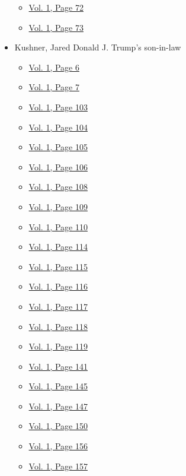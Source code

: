 \begin{itemize}
  \begin{itemize}
  \tightlist
  \item
    \protect\hyperlink{g-page-80}{Vol. 1, Page 72}
  \item
    \protect\hyperlink{g-page-81}{Vol. 1, Page 73}
  \end{itemize}
\item
  Kushner, Jared Donald J. Trump's son-in-law

  \begin{itemize}
  \tightlist
  \item
    \protect\hyperlink{g-page-14}{Vol. 1, Page 6}
  \item
    \protect\hyperlink{g-page-15}{Vol. 1, Page 7}
  \item
    \protect\hyperlink{g-page-111}{Vol. 1, Page 103}
  \item
    \protect\hyperlink{g-page-112}{Vol. 1, Page 104}
  \item
    \protect\hyperlink{g-page-113}{Vol. 1, Page 105}
  \item
    \protect\hyperlink{g-page-114}{Vol. 1, Page 106}
  \item
    \protect\hyperlink{g-page-116}{Vol. 1, Page 108}
  \item
    \protect\hyperlink{g-page-117}{Vol. 1, Page 109}
  \item
    \protect\hyperlink{g-page-118}{Vol. 1, Page 110}
  \item
    \protect\hyperlink{g-page-122}{Vol. 1, Page 114}
  \item
    \protect\hyperlink{g-page-123}{Vol. 1, Page 115}
  \item
    \protect\hyperlink{g-page-124}{Vol. 1, Page 116}
  \item
    \protect\hyperlink{g-page-125}{Vol. 1, Page 117}
  \item
    \protect\hyperlink{g-page-126}{Vol. 1, Page 118}
  \item
    \protect\hyperlink{g-page-127}{Vol. 1, Page 119}
  \item
    \protect\hyperlink{g-page-149}{Vol. 1, Page 141}
  \item
    \protect\hyperlink{g-page-153}{Vol. 1, Page 145}
  \item
    \protect\hyperlink{g-page-155}{Vol. 1, Page 147}
  \item
    \protect\hyperlink{g-page-158}{Vol. 1, Page 150}
  \item
    \protect\hyperlink{g-page-164}{Vol. 1, Page 156}
  \item
    \protect\hyperlink{g-page-165}{Vol. 1, Page 157}

\end{itemize}
\end{itemize}
